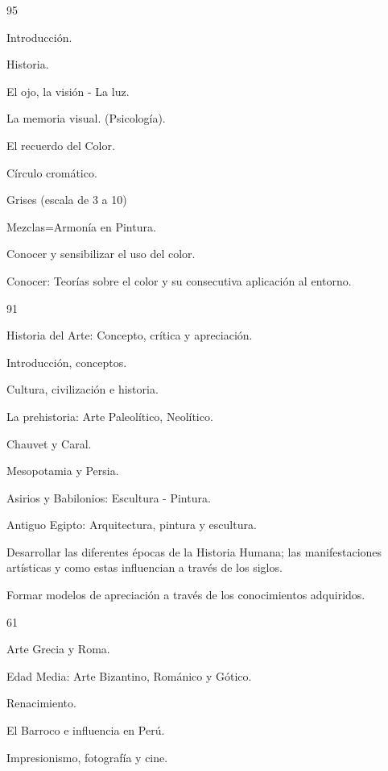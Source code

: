 \begin{syllabus}
\begin{unit}{}{}{9}{5}
\begin{topics}
	\item Introducción.
	\item Historia.
	\item El ojo, la visión - La luz.
	\item La memoria visual. (Psicología).
	\item El recuerdo del Color.
	\item Círculo cromático.
	\item Grises (escala de 3 a 10)
	\item Mezclas=Armonía en Pintura.
\end{topics}
\begin{unitgoals}
	\item Conocer y sensibilizar el uso del color.
	\item Conocer: Teorías sobre el color y su consecutiva aplicación al entorno.
\end{unitgoals}
\end{unit}

\begin{unit}{}{}{9}{1}
\begin{topics}
	\item Historia del Arte: Concepto, crítica y apreciación.
	\item Introducción, conceptos.
	\item Cultura, civilización e historia.
	\item La prehistoria: Arte Paleolítico, Neolítico.
	\item Chauvet y Caral.
	\item Mesopotamia y Persia.
	\item Asirios y Babilonios: Escultura - Pintura.
	\item Antiguo Egipto: Arquitectura, pintura y escultura.
\end{topics}
\begin{unitgoals}
	\item Desarrollar las diferentes épocas de la Historia Humana; las manifestaciones artísticas y como estas influencian a través de los siglos.
	\item Formar modelos de apreciación a través de los conocimientos adquiridos.
\end{unitgoals}
\end{unit}

\begin{unit}{}{}{6}{1}
\begin{topics}
	\item Arte Grecia y Roma.
	\item Edad Media: Arte Bizantino, Románico y Gótico.
	\item Renacimiento.
	\item El Barroco e influencia en Perú.
	\item Impresionismo, fotografía y cine.
\end{topics}


\end{unit}
\end{syllabus}
